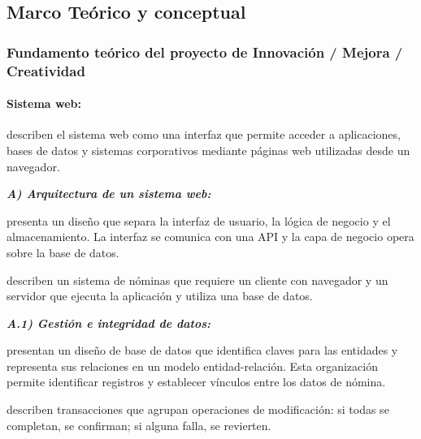 \subsection{Marco Teórico y conceptual}

\subsubsection{Fundamento teórico del proyecto de Innovación / Mejora / Creatividad}

\begingroup
\newcommand{\fundamentosubnivel}[2]{%
    \par\noindent\hspace*{\parindent}%
    \textbf{\textit{#1) #2:}}\enspace\ignorespaces
}

\paragraph{Sistema web:}

    \textcite[p.~44, sección~2.2.1, párr.~1]{aguilar2022desarrollo} 
    describen el sistema web como una interfaz que permite acceder a aplicaciones, 
    bases de datos y sistemas corporativos mediante páginas web utilizadas desde un navegador.

    \fundamentosubnivel{A}{Arquitectura de un sistema web} 
    \textcite[36--37]{suarez2025sistema} presenta un diseño que separa la interfaz de usuario, 
    la lógica de negocio y el almacenamiento. La interfaz se comunica con una API y la capa de negocio opera sobre la base de datos.

    \textcite[p.~4, sección \enquote{System requirements}]{ahmed2023web} 
    describen un sistema de nóminas que requiere un cliente con navegador y un servidor que ejecuta la aplicación y utiliza una base de datos.

    \fundamentosubnivel{A.1}{Gestión e integridad de datos} 
    \textcite[856--858]{tandrio2026web} 
    presentan un diseño de base de datos que identifica claves para las entidades y representa sus relaciones en un modelo entidad-relación. 
    Esta organización permite identificar registros y establecer vínculos entre los datos de nómina.

    \textcite[p.~5, sección \enquote{DML transactions}]{ahmed2023web} 
    describen transacciones que agrupan operaciones de modificación: si todas se completan, se confirman; si alguna falla, se revierten.

